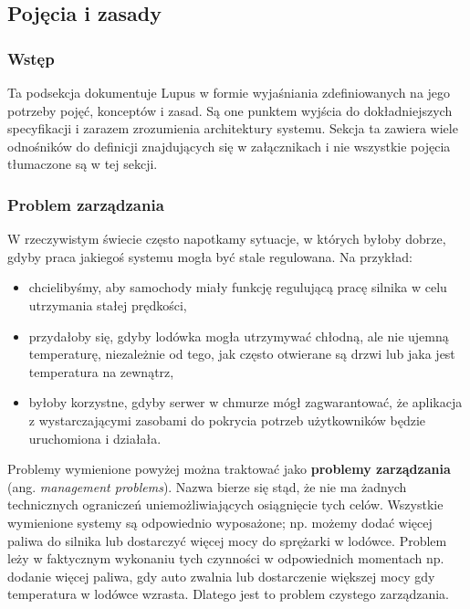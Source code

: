 \subsection{Pojęcia i zasady}

\subsubsection{Wstęp}
Ta podsekcja dokumentuje Lupus w formie wyjaśniania zdefiniowanych na jego potrzeby pojęć, konceptów i zasad. Są one punktem wyjścia do dokładniejszych specyfikacji i zarazem zrozumienia architektury systemu. Sekcja ta zawiera wiele odnośników do definicji znajdujących się w załącznikach i nie wszystkie pojęcia tłumaczone są w tej sekcji.

\subsubsection{Problem zarządzania}

W rzeczywistym świecie często napotkamy sytuacje, w których byłoby dobrze, gdyby praca jakiegoś systemu mogła być stale regulowana. Na przykład:

\begin{itemize}
    \item chcielibyśmy, aby samochody miały funkcję regulującą pracę silnika w celu utrzymania stałej prędkości,
    \item przydałoby się, gdyby lodówka mogła utrzymywać chłodną, ale nie ujemną temperaturę, niezależnie od tego, jak często otwierane są drzwi lub jaka jest temperatura na zewnątrz,
    \item byłoby korzystne, gdyby serwer w chmurze mógł zagwarantować, że aplikacja z wystarczającymi zasobami do pokrycia potrzeb użytkowników będzie uruchomiona i działała.
\end{itemize}

Problemy wymienione powyżej można traktować jako \textbf{problemy zarządzania} (ang. \textit{management problems}). Nazwa bierze się stąd, że nie ma żadnych technicznych ograniczeń uniemożliwiających osiągnięcie tych celów. Wszystkie wymienione systemy są odpowiednio wyposażone; np. możemy dodać więcej paliwa do silnika lub dostarczyć więcej mocy do sprężarki w lodówce. Problem leży w faktycznym wykonaniu tych czynności w odpowiednich momentach np. dodanie więcej paliwa, gdy auto zwalnia lub dostarczenie większej mocy gdy temperatura w lodówce wzrasta. Dlatego jest to problem czystego zarządzania.

